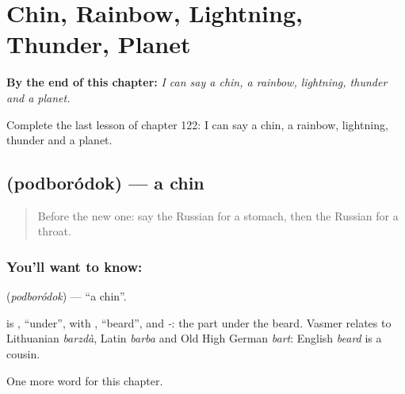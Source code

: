 
\chapter{Chin, Rainbow, Lightning, Thunder, Planet}
\label{ch:ru-chin-rainbow-lightning-thunder-planet}

\begin{chapteropening}
\textbf{By the end of this chapter:} \emph{I can say a chin, a rainbow, lightning, thunder and a planet.}

Complete the last lesson of chapter 122: I can say a chin, a rainbow, lightning, thunder and a planet.
\end{chapteropening}

\section[\texorpdfstring{\ru{подбородок} (podboródok)}{подбородок (podboródok)}]{ (podboródok) — a chin}

\label{lesson:RU-C122-chin}



\begin{quote}
Before the new one: say the Russian for a stomach, then the Russian for a throat.
\end{quote}

\subsection*{You'll want to know: }
\textbf{} (\emph{podboródok}) — \textquotedblleft{}a chin\textquotedblright{}.

\begin{cousinweb}
\textbf{} is \emph{}, \textquotedblleft{}under\textquotedblright{}, with \emph{}, \textquotedblleft{}beard\textquotedblright{}, and \emph{-}: the part under the beard. Vasmer relates \emph{} to Lithuanian \emph{barzdà}, Latin \emph{barba} and Old High German \emph{bart}: English \emph{beard} is a cousin.
\end{cousinweb}

\begin{grammarlens}[title={What you've built}]
One more word for this chapter.
\end{grammarlens}

